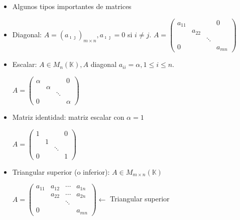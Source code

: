 \documentclass[12pt]{article}
\begin{document}
\begin{itemize}[label=\color{red}\textbullet, leftmargin=*]
\item \color{lightblue} Algunos tipos importantes de matrices\end{itemize}
\begin{itemize}
\item Diagonal: $A=(a_{\imath\jmath  })_{m\times n}, a_{\imath\jmath  }=0$ si $i\neq j$.
          $A=\begin{pmatrix}
                  a_{11} &        &        & 0      \\
                         & a_{22} &        &        \\
                         &        & \ddots &        \\
                  0      &        &        & a_{mn}
              \end{pmatrix}$

\item Escalar: $A\in M_n(\mathbb{K}), A$ diagonal
$a_{ii}=\alpha,1\le i\le n$.

          $A=\begin{pmatrix}
                  \alpha &        &        & 0      \\
                         & \alpha &        &        \\
                         &        & \ddots &        \\
                  0      &        &        & \alpha
              \end{pmatrix}$

    \item Matriz identidad: matriz escalar con $\alpha=1$

          $A=\begin{pmatrix}
                  1 &   &        & 0 \\
                    & 1 &        &   \\
                    &   & \ddots &   \\
                  0 &   &        & 1
              \end{pmatrix}$

\item Triangular superior (o inferior): $A\in M_{m\times
n}(\mathbb{K})$

          $A=\begin{pmatrix}
                  a_{11} & a_{12} & \cdots & a_{1n} \\
                         & a_{22} & \cdots & a_{2n} \\
                         &        & \ddots &        \\
                  0      &        &        & a_{mn}
              \end{pmatrix}\longleftarrow$ Triangular superior


\end{itemize}
\end{document}
